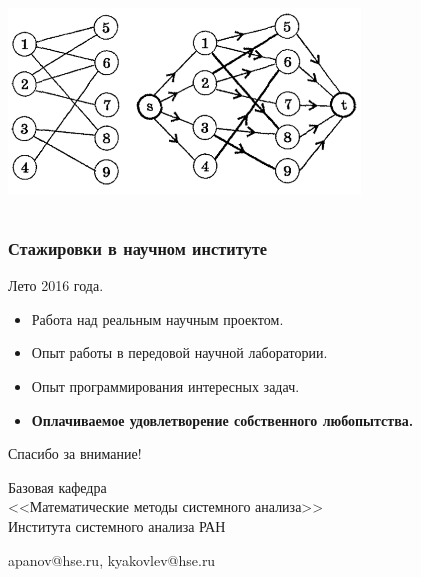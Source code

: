 \documentclass[default]{beamer}
\begin{document}
\begin{frame}
\begin{columns}
\begin{column}{0.5\textwidth}
				\par\bigskip
				\includegraphics[width=0.7\textwidth]{advert/graph}
			\end{column}			
		\end{columns}
	\end{frame}

	\begin{frame}
		\frametitle{Стажировки в научном институте}
		
		Лето 2016 года.
		\par\bigskip
		\begin{itemize}
			\item Работа над реальным научным проектом.
			\item Опыт работы в передовой научной лаборатории.
			\item Опыт программирования интересных задач.
			\item \textbf{Оплачиваемое удовлетворение собственного любопытства.}
		\end{itemize}
	\end{frame}
	
	\begin{frame}
		\centering
		\Huge
		Спасибо за внимание!
		\normalsize
		\par\bigskip
		\par\bigskip
		Базовая кафедра\\
		<<Математические методы системного анализа>>\\
		Института системного анализа РАН
		\par\bigskip
		\par\bigskip
		apanov@hse.ru, kyakovlev@hse.ru
	\end{frame}
														
%		
%				
	
\end{document}
